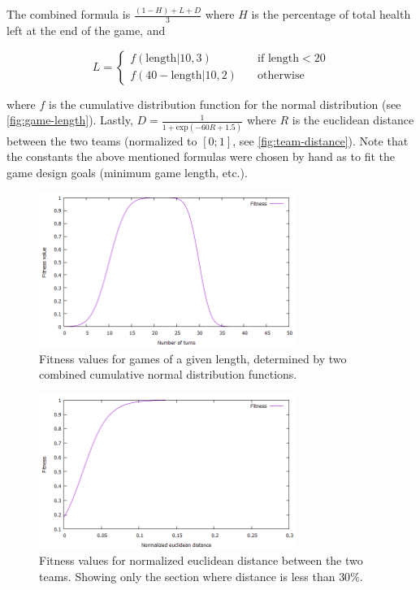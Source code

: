 The combined formula is $\frac{(1 - H) + L + D}{3}$ where $H$ is the percentage of total health left at the end of the game, and

\[
L = \begin{cases}
f(\text{length} | 10, 3) &\quad\text{if length} < 20 \\
f(40 - \text{length} | 10, 2) &\quad\text{otherwise}
\end{cases}
\]


where $f$ is the cumulative distribution function for the normal distribution (see \autoref{fig:game-length}). Lastly, $D = \frac{1}{1 + \text{exp}(-60R + 1.5)}$ where $R$ is the euclidean distance between the two teams (normalized to $[0;1]$, see \autoref{fig:team-distance}). Note that the constants the above mentioned formulas were chosen by hand as to fit the game design goals (minimum game length, etc.).

\begin{figure}
	\centering
	\includegraphics[width=0.75\textwidth]{img/game-length-fitness.png}
	\caption{Fitness values for games of a given length, determined by two combined cumulative normal distribution functions.}
	\label{fig:game-length}	
\end{figure}

\begin{figure}
	\centering
	\includegraphics[width=0.75\textwidth]{img/team-distance.png}
	\caption{Fitness values for normalized euclidean distance between the two teams. Showing only the section where distance is less than $30\%$.}
	\label{fig:team-distance}	
\end{figure}



